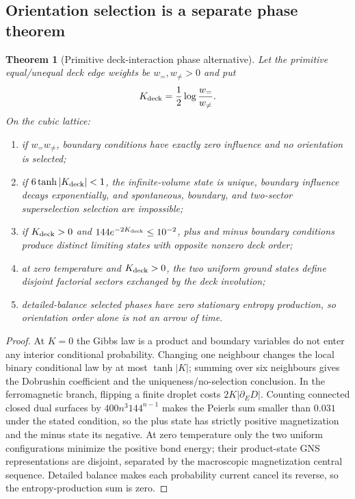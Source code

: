 \documentclass[11pt]{article}
\newtheorem{theorem}{Theorem}[section]
\theoremstyle{definition}
\theoremstyle{remark}
\begin{document}
\subsection{Orientation selection is a separate phase theorem}

\begin{theorem}[Primitive deck-interaction phase alternative]
\label{thm:orientation-phase-master}
Let the primitive equal/unequal deck edge weights be $w_{=},w_{\ne}>0$ and put
\[
 K_{\rm deck}=\frac12\log\frac{w_=}{w_{\ne}}.
\]
On the cubic lattice:
\begin{enumerate}[label=\textup{(O\arabic*)},leftmargin=3em]
\item if $w_=w_{\ne}$, boundary conditions have exactly zero influence and no
      orientation is selected;
\item if $6\tanh|K_{\rm deck}|<1$, the infinite-volume state is unique,
      boundary influence decays exponentially, and spontaneous, boundary, and
      two-sector superselection selection are impossible;
\item if $K_{\rm deck}>0$ and
      $144e^{-2K_{\rm deck}}\le10^{-2}$, plus and minus boundary conditions
      produce distinct limiting states with opposite nonzero deck order;
\item at zero temperature and $K_{\rm deck}>0$, the two uniform ground states
      define disjoint factorial sectors exchanged by the deck involution;
\item detailed-balance selected phases have zero stationary entropy production,
      so orientation order alone is not an arrow of time.
\end{enumerate}
\end{theorem}

\begin{proof}
At $K=0$ the Gibbs law is a product and boundary variables do not enter any
interior conditional probability.  Changing one neighbour changes the local
binary conditional law by at most $\tanh|K|$; summing over six neighbours gives
the Dobrushin coefficient and the uniqueness/no-selection conclusion.  In the
ferromagnetic branch, flipping a finite droplet costs
$2K|\partial_E D|$.  Counting connected closed dual surfaces by
$400n^3 144^{n-1}$ makes the Peierls sum smaller than $0.031$ under the stated
condition, so the plus state has strictly positive magnetization and the minus
state its negative.  At zero temperature only the two uniform configurations
minimize the positive bond energy; their product-state GNS representations are
disjoint, separated by the macroscopic magnetization central sequence.
Detailed balance makes each probability current cancel its reverse, so the
entropy-production sum is zero.
\end{proof}
\end{document}
